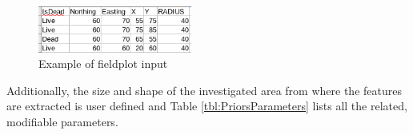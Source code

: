 \documentclass{subfiles}
\begin{document}
		  \begin{figure} [h!]
		  	\centering
		  	\includegraphics[width=0.45\textwidth]{tex/Appendices/img/fieldplot}
		  	\caption{Example of fieldplot input}
		  	\label{fig:fieldplot}
		  \end{figure}	
		
		\par {\color{blue} Additionally, the size and shape of the investigated area from where the features are extracted is user defined and Table \ref{tbl:PriorsParameters} lists all the related, modifiable parameters.}
		
					\newpage
\end{document}
